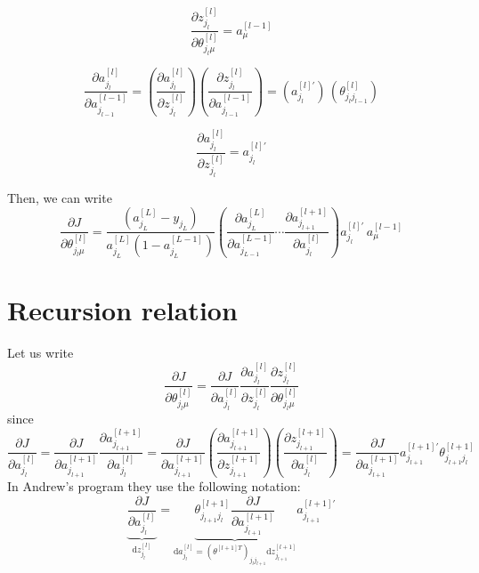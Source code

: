 \documentclass[a4paper,11pt]{article}
\newcommand{\dd}{\text{d}}
\newcommand{\na}[2]{a_{#1}^{[#2]}}
\newcommand{\nz}[2]{z_{#1}^{[#2]}}
\newcommand{\nt}[3]{\theta_{#1 #2}^{[#3]}}
\begin{document}
\begin{equation}
  \frac{\partial \nz{j_l}{l}  }
        {\partial \nt{j_l}{\mu}{l}  }
        =  \na{\mu}{l-1}
\end{equation}

\begin{equation}
    \frac{\partial \na{j_l}{l}  }
    {\partial \na{j_{l-1}}{l-1}  }
    =
   \left( \frac{\partial \na{j_l}{l}}   {\partial \nz{j_{l}}{l}  }\right)
   \left( \frac{\partial \nz{j_{l}}{l} }   {\partial \na{j_{l-1}}{l-1}  }\right)
    = \left( a^{[l]'}_{j_{l} }\right)
    \, \left( \nt{j_l}{j_{l-1}}{l} \right)
\end{equation}

\begin{equation}
	\frac{\partial \na{j_{l}}{l}   }{\partial \nz{j_{l}}{l}   } =  a_{j_{l}}^{[l]'}
\end{equation} 

Then, we can write
\begin{equation}
    \frac{\partial J }{\partial  \nt{j_l}{\mu}{l}  } =
    \frac{(\na{j_L}{L} -y_{j_L})}{\na{j_L}{L} (1-\na{j_L}{L-1} )} 
    \left(
    \frac{\partial \na{j_L}{L}  }{\partial \na{j_{L-1}}{L-1}  }
    \cdots\frac{\partial \na{j_{l+1}}{l+1}   }{\partial \na{j_{l}}{l}   } 
    \right) a_{j_{l}}^{[l]'} 
   \, \na{\mu}{l-1} 
\end{equation}

\section{Recursion relation}
Let us write
\begin{equation}
    \frac{\partial J }{\partial  \nt{j_l}{\mu}{l}  } 
   =\frac{\partial J  }{\partial \na{j_l}{l}   }
    \frac{\partial \na{j_l}{l}   }{\partial \nz{j_l}{l}   }
    \frac{\partial \nz{j_l}{l} }
        {\partial \nt{j_l}{\mu}{l}  }
\end{equation}
since 
\begin{equation}
\frac{\partial J  }{\partial \na{j_l}{l}   }
= \frac{\partial J  }{\partial \na{j_{l+1}}{l+1}   } \frac{\partial \na{j_{l+1}}{l+1}   }{ \partial \na{j_{l}}{l}  }
= \frac{\partial J  }{\partial \na{j_{l+1}}{l+1}   } 
  \left( \frac{\partial \na{j_{l+1}}{l+1}}   {\partial \nz{j_{l+1}}{l+1}  }\right)
   \left( \frac{\partial \nz{j_{l+1}}{l+1} }   {\partial \na{j_{l}}{l}  }\right)
=\frac{\partial J  }{\partial \na{j_{l+1}}{l+1}   } a^{[l+1]'}_{j_{l+1} }  \nt{j_{l+1}}{j_{l}}{l+1}
\end{equation}
In Andrew's program they use the following notation:
\begin{equation}
\underbrace{\frac{\partial J  }{\partial \na{j_l}{l}   }}_{\dd z_{j_l}^{[l]} }
=\underbrace{\nt{j_{l+1}}{j_{l}}{l+1} \frac{\partial J  }{\partial \na{j_{l+1}}{l+1}   }   }
_{ \dd a_{j_{l}}^{[l]}  =  (\theta^{[l+1]T} )_{j_{l} j_{l+1}}   \dd z_{j_{l+1}}^{[l+1]}  } 
a^{[l+1]'}_{j_{l+1} }
\end{equation}

\end{document}
